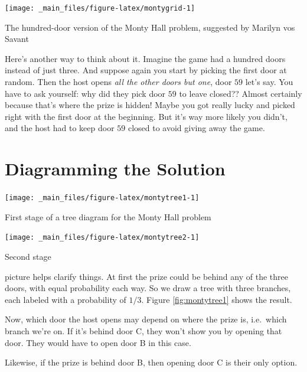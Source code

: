 \documentclass[justified]{tufte-book}
\begin{document}
\begin{marginfigure}
\texttt{[image: \_main\_files/figure-latex/montygrid-1]} \caption[The hundred-door version of the Monty Hall problem, suggested by Marilyn vos Savant]{The hundred-door version of the Monty Hall problem, suggested by Marilyn vos Savant}\label{fig:montygrid}
\end{marginfigure}

Here's another way to think about it. Imagine the game had a hundred doors instead of just three. And suppose again you start by picking the first door at random. Then the host opens \emph{all the other doors but one}, door \(59\) let's say. You have to ask yourself: why did they pick door \(59\) to leave closed?? Almost certainly because that's where the prize is hidden! Maybe you got really lucky and picked right with the first door at the beginning. But it's way more likely you didn't, and the host had to keep door \(59\) closed to avoid giving away the game.

\hypertarget{diagramming-the-solution}{%
\section{Diagramming the Solution}\label{diagramming-the-solution}}

\begin{marginfigure}
\texttt{[image: \_main\_files/figure-latex/montytree1-1]} \caption[First stage of a tree diagram for the Monty Hall problem]{First stage of a tree diagram for the Monty Hall problem}\label{fig:montytree1}
\end{marginfigure}
\begin{marginfigure}
\texttt{[image: \_main\_files/figure-latex/montytree2-1]} \caption[Second stage]{Second stage}\label{fig:montytree2}
\end{marginfigure}

 picture helps clarify things. At first the prize could be behind any of the three doors, with equal probability each way. So we draw a tree with three branches, each labeled with a probability of \(1/3\). Figure \ref{fig:montytree1} shows the result.

Now, which door the host opens may depend on where the prize is, i.e.~which branch we're on. If it's behind door C, they won't show you by opening that door. They would have to open door B in this case.

Likewise, if the prize is behind door B, then opening door C is their only option.
\end{document}
